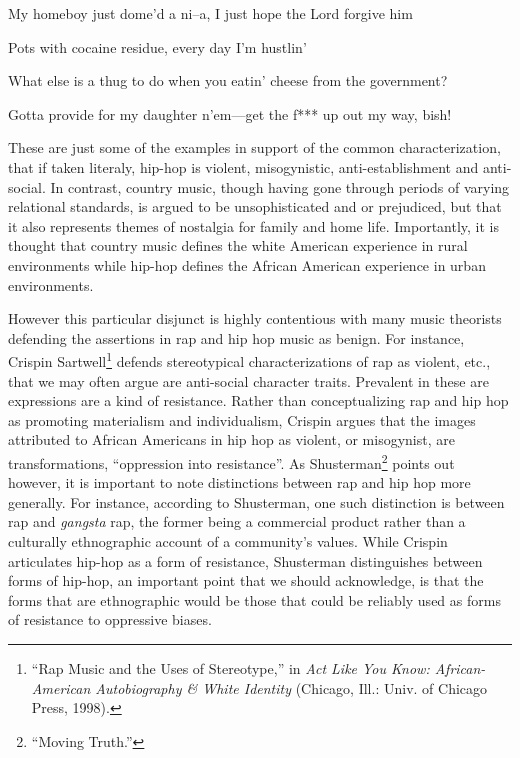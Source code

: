 \documentclass[phdthesis,12pt,final,a4paper]{wuthesis}
\theoremstyle{definition}
\theoremstyle{definition}
\theoremstyle{definition}
\theoremstyle{definition}
\theoremstyle{remark}
\begin{document}
My homeboy just dome'd a ni--a, I just hope the Lord forgive him

Pots with cocaine residue, every day I'm hustlin'

What else is a thug to do when you eatin' cheese from the government?

Gotta provide for my daughter n'em---get the f*** up out my way, bish!

These are just some of the examples in support of the common characterization, that if taken literaly, hip-hop is violent, misogynistic, anti-establishment and anti-social. In contrast, country music, though having gone through periods of varying relational standards, is argued to be unsophisticated and or prejudiced, but that it also represents themes of nostalgia for family and home life. Importantly, it is thought that country music defines the white American experience in rural environments while hip-hop defines the African American experience in urban environments.

However this particular disjunct is highly contentious with many music theorists defending the assertions in rap and hip hop music as benign. For instance, Crispin Sartwell\footnote{{``Rap {Music} and the {Uses} of {Stereotype},''} in \emph{Act Like You Know: {African-American} Autobiography \& White Identity} (Chicago, Ill.: Univ. of Chicago Press, 1998).} defends stereotypical characterizations of rap as violent, etc., that we may often argue are anti-social character traits. Prevalent in these are expressions are a kind of resistance. Rather than conceptualizing rap and hip hop as promoting materialism and individualism, Crispin argues that the images attributed to African Americans in hip hop as violent, or misogynist, are transformations, ``oppression into resistance''. As Shusterman\footnote{{``Moving {Truth}.''}} points out however, it is important to note distinctions between rap and hip hop more generally. For instance, according to Shusterman, one such distinction is between rap and \emph{gangsta} rap, the former being a commercial product rather than a culturally ethnographic account of a community's values. While Crispin articulates hip-hop as a form of resistance, Shusterman distinguishes between forms of hip-hop, an important point that we should acknowledge, is that the forms that are ethnographic would be those that could be reliably used as forms of resistance to oppressive biases.
\end{document}
